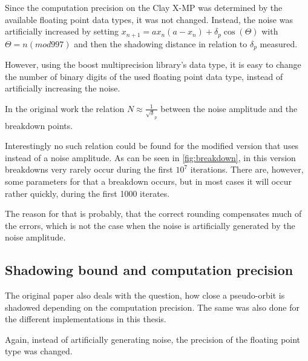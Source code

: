   Since the computation precision on the Clay X-MP was determined by the available floating point data types, it was not changed.
  Instead, the noise was artificially increased by setting $x_{n+1} =
  ax_n(a-x_n)+\delta_p \cos (\Theta)$ with $\Theta = n (mod 997)$ and then the
  shadowing distance in relation to $\delta_p$ measured.  
  
  However, using the boost multiprecision library's  data
  type, it is easy to change the number of binary digits of the used floating
  point data type, instead of artificially increasing the noise.

  In the original work the relation $N \approx \frac{1}{\sqrt \delta_p}$
  between the noise amplitude and the breakdown points.

  Interestingly no such relation could be found for the modified version that
  uses  instead of a noise amplitude.
  As can be seen in \ref{fig:breakdown}, in this version breakdowns very rarely occur during the first $10^7$
  iterations.
  There are, however, some parameters for that a breakdown occurs, but in most
  cases it will occur rather quickly, during the first 1000 iterates.

  The reason for that is probably, that the correct rounding compensates much
  of the errors, which is not the case when the noise is artificially generated
  by the noise amplitude.

  \subsection{Shadowing bound and computation precision}
  The original paper also deals with the question, how close a pseudo-orbit is
  shadowed depending on the computation precision. The same was also done for
  the different implementations in this thesis.

  Again, instead of artificially generating noise, the precision of the
  floating point type was changed.

